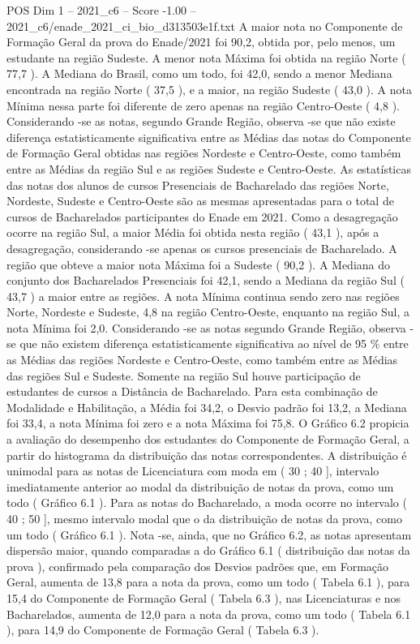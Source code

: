 \begin{textsample}{POS Dim 1 – 2021\_c6 – Score -1.00 – 2021\_c6/enade\_2021\_ci\_bio\_d313503e1f.txt}
A maior nota no Componente de Formação Geral da prova do Enade/2021 foi 90,2, obtida por, pelo menos, um estudante na região Sudeste.
A menor nota Máxima foi obtida na região Norte ( 77,7 ).
A Mediana do Brasil, como um todo, foi 42,0, sendo a menor Mediana encontrada na região Norte ( 37,5 ), e a maior, na região Sudeste ( 43,0 ).
A nota Mínima nessa parte foi diferente de zero apenas na região Centro-Oeste ( 4,8 ).
Considerando -se as notas, segundo Grande Região, observa -se que não existe diferença estatisticamente significativa entre as Médias das notas do Componente de Formação Geral obtidas nas regiões Nordeste e Centro-Oeste, como também entre as Médias da região Sul e as regiões Sudeste e Centro-Oeste.
As estatísticas das notas dos alunos de cursos Presenciais de Bacharelado das regiões Norte, Nordeste, Sudeste e Centro-Oeste são as mesmas apresentadas para o total de cursos de Bacharelados participantes do Enade em 2021.
Como a desagregação ocorre na região Sul, a maior Média foi obtida nesta região ( 43,1 ), após a desagregação, considerando -se apenas os cursos presenciais de Bacharelado.
A região que obteve a maior nota Máxima foi a Sudeste ( 90,2 ).
A Mediana do conjunto dos Bacharelados Presenciais foi 42,1, sendo a Mediana da região Sul ( 43,7 ) a maior entre as regiões.
A nota Mínima continua sendo zero nas regiões Norte, Nordeste e Sudeste, 4,8 na região Centro-Oeste, enquanto na região Sul, a nota Mínima foi 2,0.
Considerando -se as notas segundo Grande Região, observa -se que não existem diferença estatisticamente significativa ao nível de 95 \% entre as Médias das regiões Nordeste e Centro-Oeste, como também entre as Médias das regiões Sul e Sudeste.
Somente na região Sul houve participação de estudantes de cursos a Distância de Bacharelado.
Para esta combinação de Modalidade e Habilitação, a Média foi 34,2, o Desvio padrão foi 13,2, a Mediana foi 33,4, a nota Mínima foi zero e a nota Máxima foi 75,8.
O Gráfico 6.2 propicia a avaliação do desempenho dos estudantes do Componente de Formação Geral, a partir do histograma da distribuição das notas correspondentes.
A distribuição é unimodal para as notas de Licenciatura com moda em ( 30 ; 40 ], intervalo imediatamente anterior ao modal da distribuição de notas da prova, como um todo ( Gráfico 6.1 ).
Para as notas do Bacharelado, a moda ocorre no intervalo ( 40 ; 50 ], mesmo intervalo modal que o da distribuição de notas da prova, como um todo ( Gráfico 6.1 ).
Nota -se, ainda, que no Gráfico 6.2, as notas apresentam dispersão maior, quando comparadas a do Gráfico 6.1 ( distribuição das notas da prova ), confirmado pela comparação dos Desvios padrões que, em Formação Geral, aumenta de 13,8 para a nota da prova, como um todo ( Tabela 6.1 ), para 15,4 do Componente de Formação Geral ( Tabela 6.3 ), nas Licenciaturas e nos Bacharelados, aumenta de 12,0 para a nota da prova, como um todo ( Tabela 6.1 ), para 14,9 do Componente de Formação Geral ( Tabela 6.3 ).

\end{textsample}
